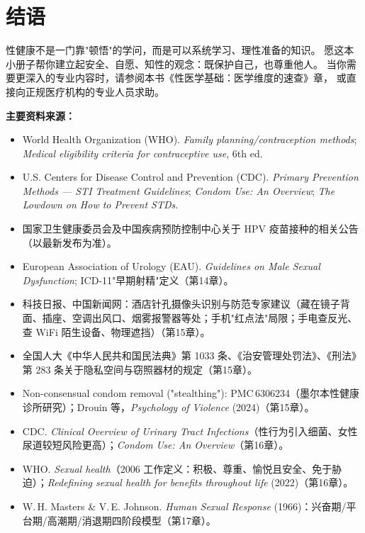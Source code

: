 \documentclass[12pt,UTF8,openany]{ctexbook}
\begin{document}
\chapter*{结语}

性健康不是一门靠"顿悟"的学问，而是可以系统学习、理性准备的知识。
愿这本小册子帮你建立起安全、自愿、知性的观念：既保护自己，也尊重他人。
当你需要更深入的专业内容时，请参阅本书《性医学基础：医学维度的速查》章，
或直接向正规医疗机构的专业人员求助。

\vspace{2em}

\noindent\textbf{主要资料来源：}
\begin{itemize}[leftmargin=2em]
  \item World Health Organization (WHO). \emph{Family planning/contraception methods}; \emph{Medical eligibility criteria for contraceptive use}, 6th ed.
  \item U.S. Centers for Disease Control and Prevention (CDC). \emph{Primary Prevention Methods — STI Treatment Guidelines}; \emph{Condom Use: An Overview}; \emph{The Lowdown on How to Prevent STDs}.
  \item 国家卫生健康委员会及中国疾病预防控制中心关于 HPV 疫苗接种的相关公告（以最新发布为准）。
  \item European Association of Urology (EAU). \emph{Guidelines on Male Sexual Dysfunction}; ICD-11"早期射精"定义（第14章）。
  \item 科技日报、中国新闻网：酒店针孔摄像头识别与防范专家建议（藏在镜子背面、插座、空调出风口、烟雾报警器等处；手机"红点法"局限；手电查反光、查 WiFi 陌生设备、物理遮挡）（第15章）。
  \item 全国人大《中华人民共和国民法典》第 1033 条、《治安管理处罚法》、《刑法》第 283 条关于隐私空间与窃照器材的规定（第15章）。
  \item Non-consensual condom removal ("stealthing"): PMC\,6306234（墨尔本性健康诊所研究）；Drouin 等，\emph{Psychology of Violence} (2024)（第15章）。
  \item CDC. \emph{Clinical Overview of Urinary Tract Infections}（性行为引入细菌、女性尿道较短风险更高）；\emph{Condom Use: An Overview}（第16章）。
  \item WHO. \emph{Sexual health}（2006 工作定义：积极、尊重、愉悦且安全、免于胁迫）；\emph{Redefining sexual health for benefits throughout life} (2022)（第16章）。
  \item W.\,H. Masters \& V.\,E. Johnson. \emph{Human Sexual Response} (1966)：兴奋期/平台期/高潮期/消退期四阶段模型（第17章）。

\end{itemize}
\end{document}

